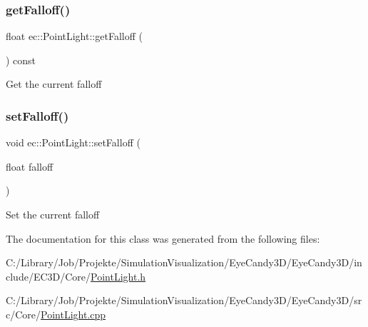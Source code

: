 \subsubsection{\texorpdfstring{get\+Falloff()}{getFalloff()}}
{\footnotesize\ttfamily float ec\+::\+Point\+Light\+::get\+Falloff (\begin{DoxyParamCaption}{ }\end{DoxyParamCaption}) const}

Get the current falloff \mbox{\label{classec_1_1_point_light_a64949f08f93b178b110f9c366d72ce89}} 
\subsubsection{\texorpdfstring{set\+Falloff()}{setFalloff()}}
{\footnotesize\ttfamily void ec\+::\+Point\+Light\+::set\+Falloff (\begin{DoxyParamCaption}\item[{float}]{falloff }\end{DoxyParamCaption})}

Set the current falloff 

The documentation for this class was generated from the following files\+:\begin{DoxyCompactItemize}
\item 
C\+:/\+Library/\+Job/\+Projekte/\+Simulation\+Visualization/\+Eye\+Candy3\+D/\+Eye\+Candy3\+D/include/\+E\+C3\+D/\+Core/\mbox{\hyperlink{_point_light_8h}{Point\+Light.\+h}}\item 
C\+:/\+Library/\+Job/\+Projekte/\+Simulation\+Visualization/\+Eye\+Candy3\+D/\+Eye\+Candy3\+D/src/\+Core/\mbox{\hyperlink{_point_light_8cpp}{Point\+Light.\+cpp}}\end{DoxyCompactItemize}

